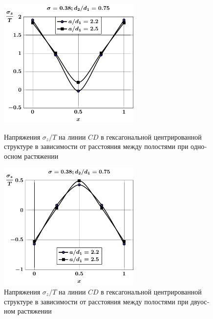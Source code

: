 \begin{russian}
\begin{figure}[h!]
\centering\footnotesize
\parbox[b]{7cm}{\centering\includegraphics[width=7cm]{cav13-a-d75-t1-sig_z-cd.pdf}
\caption{Напряжения $\sigma_z/T$ на линии $CD$ в гексагональной центрированной структуре в зависимости от расстояния между полостями при одноосном растяжении 
\label{f:9:54}}}\hfil\hfil
\parbox[b]{7cm}{\centering\includegraphics[width=7cm]{cav13-a-d75-t2-sig_z-cd.pdf}
\caption{Напряжения $\sigma_z/T$ на линии $CD$ в гексагональной центрированной структуре в зависимости от расстояния между полостями при двуосном растяжении
\label{f:9:55}}}
\end{figure}


\end{russian}

